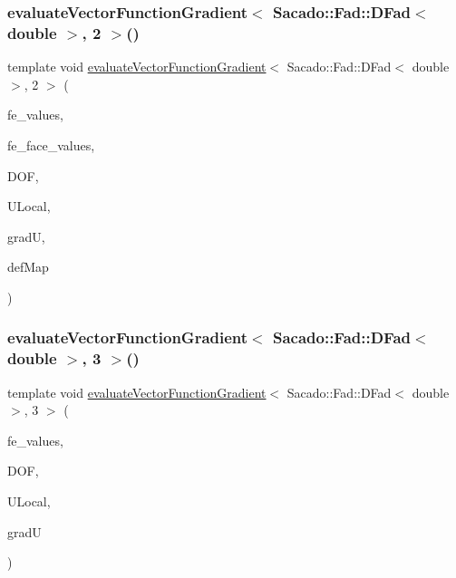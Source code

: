 \subsubsection{\texorpdfstring{evaluateVectorFunctionGradient$<$ Sacado::Fad::DFad$<$ double $>$, 2 $>$()}{evaluateVectorFunctionGradient< Sacado::Fad::DFad< double >, 2 >()}\hspace{0.1cm}{\footnotesize\ttfamily [4/4]}}
{\footnotesize\ttfamily template void \mbox{\hyperlink{group___evaluation_functions_ga9608539d601a91aff1ba01ccc720fbe0}{evaluate\+Vector\+Function\+Gradient}}$<$ Sacado\+::\+Fad\+::\+D\+Fad$<$ double $>$, 2 $>$ (\begin{DoxyParamCaption}\item[{const F\+E\+Values$<$ 2 $>$ \&}]{fe\+\_\+values,  }\item[{const F\+E\+Face\+Values$<$ 2 $>$ \&}]{fe\+\_\+face\+\_\+values,  }\item[{unsigned int}]{D\+OF,  }\item[{Table$<$ 1, Sacado\+::\+Fad\+::\+D\+Fad$<$ double $>$$>$ \&}]{U\+Local,  }\item[{Table$<$ 3, Sacado\+::\+Fad\+::\+D\+Fad$<$ double $>$$>$ \&}]{gradU,  }\item[{\mbox{\hyperlink{structdeformation_map}{deformation\+Map}}$<$ Sacado\+::\+Fad\+::\+D\+Fad$<$ double $>$, 2 $>$ \&}]{def\+Map }\end{DoxyParamCaption})}

\mbox{\label{function_evaluations_8cc_afdde5bc51307ce007f95ba2af9d138b2}} 
\subsubsection{\texorpdfstring{evaluateVectorFunctionGradient$<$ Sacado::Fad::DFad$<$ double $>$, 3 $>$()}{evaluateVectorFunctionGradient< Sacado::Fad::DFad< double >, 3 >()}\hspace{0.1cm}{\footnotesize\ttfamily [1/4]}}
{\footnotesize\ttfamily template void \mbox{\hyperlink{group___evaluation_functions_ga9608539d601a91aff1ba01ccc720fbe0}{evaluate\+Vector\+Function\+Gradient}}$<$ Sacado\+::\+Fad\+::\+D\+Fad$<$ double $>$, 3 $>$ (\begin{DoxyParamCaption}\item[{const F\+E\+Values$<$ 3 $>$ \&}]{fe\+\_\+values,  }\item[{unsigned int}]{D\+OF,  }\item[{Table$<$ 1, Sacado\+::\+Fad\+::\+D\+Fad$<$ double $>$$>$ \&}]{U\+Local,  }\item[{Table$<$ 3, Sacado\+::\+Fad\+::\+D\+Fad$<$ double $>$$>$ \&}]{gradU }\end{DoxyParamCaption})}

